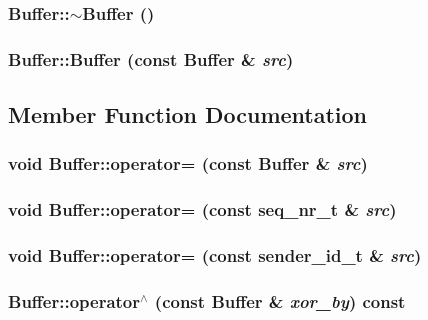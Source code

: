 \subsubsection{\setlength{\rightskip}{0pt plus 5cm}Buffer::$\sim$Buffer ()\hspace{0.3cm}{\tt  [virtual]}}\label{classBuffer_59b8743e4a5f731bdd0c4185c9ef263b}


\subsubsection{\setlength{\rightskip}{0pt plus 5cm}Buffer::Buffer (const {\bf Buffer} \& {\em src})}\label{classBuffer_042fe5bc1f8d0c25d5707d6955d1654c}




\subsection{Member Function Documentation}
\subsubsection{\setlength{\rightskip}{0pt plus 5cm}void Buffer::operator= (const {\bf Buffer} \& {\em src})}\label{classBuffer_14cec0d3bf4f3f1a4a9930a8c53eb43a}


\subsubsection{\setlength{\rightskip}{0pt plus 5cm}void Buffer::operator= (const {\bf seq\_\-nr\_\-t} \& {\em src})}\label{classBuffer_b62dfbb5605a860aa63771f3b1c29b1e}


\subsubsection{\setlength{\rightskip}{0pt plus 5cm}void Buffer::operator= (const {\bf sender\_\-id\_\-t} \& {\em src})}\label{classBuffer_b3bda89f495b3895a533155f593ab503}


\subsubsection{ Buffer::operator$^\wedge$ (const {\bf Buffer} \& {\em xor\_\-by}) const\hspace{0.3cm}{\tt  [virtual]}}\label{classBuffer_d56159a415541fcff34ef8aed1eb7183}


